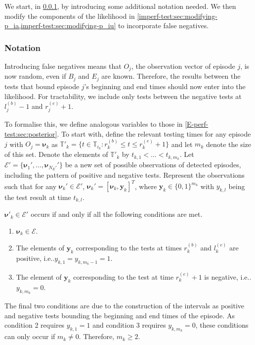 \documentclass[12pt]{article}
\makeatletter
\newcommand\set{\mathcal}
\renewcommand{\vec}[1]{\bm{#1}}
\newcommand{\ssep}{:}
\newcommand{\sched}{\mathbb{T}}
\DeclareRobustCommand\onedot{\futurelet\@let@token\@onedot}
\def\@onedot{\ifx\@let@token.\else.\null\fi\xspace}
\def\ie{i.e\onedot} \def\Ie{{I.e}\onedot}
\makeatother
\begin{document}
We start, in \cref{imperf-test:sec:notation}, by introducing some additional notation needed.
We then modify the components of the likelihood in \cref{imperf-test:sec:modifying-p_ia,imperf-test:sec:modifying-p_iu} to incorporate false negatives.


\subsubsection{Notation} \label{imperf-test:sec:notation}

Introducing false negatives means that $O_j$, the observation vector of episode $j$, is now random, even if $B_j$ and $E_j$ are known.
Therefore, the results between the tests that bound episode $j$'s beginning and end times should now enter into the likelihood.
For tractability, we include only tests between the negative tests at $l_j^{(b)}-1$ and $r_j^{(e)}+1$. 

To formalise this, we define analogous variables to those in \cref{E-perf-test:sec:posterior}.
To start with, define the relevant testing times for any episode $j$ with $O_j = \vec{\nu}_k$ as $\sched'_k = \{ t \in \sched_{i_k} \ssep r_k^{(b)} \leq t \leq r_k^{(e)} + 1 \}$ and let $m_k$ denote the size of this set.
Denote the elements of $\sched'_k$ by $t_{k,1} < \dots < t_{k,m_k}$.
Let $\set{E}' = \{ \vec{\nu}_1', \dots, \vec{\nu}_{N_E'}' \}$ be a new set of possible observations of detected episodes, including the pattern of positive and negative tests.
Represent the observations such that for any $\vec{\nu}_k' \in \set{E}'$, $\vec{\nu}_k' = [\vec{\nu}_{k}, \vec{y}_k]^T$, where $\vec{y}_k \in \{ 0, 1 \}^{m_k}$ with $y_{k,l}$ being the test result at time $t_{k,l}$.

$\vec{\nu}'_k \in \set{E}'$ occurs if and only if all the following conditions are met.
\begin{enumerate}
  \item $\vec{\nu}_k \in \set{E}$.
  \item The elements of $\vec{y}_k$ corresponding to the tests at times $r_k^{(b)}$ and $l_k^{(e)}$ are positive, \ie $y_{k,1} = y_{k,m_k-1} = 1$.
  \item The element of $\vec{y}_k$ corresponding to the test at time $r_k^{(e)} + 1$ is negative, \ie $y_{k,m_k} = 0$.
\end{enumerate}
The final two conditions are due to the construction of the intervals as positive and negative tests bounding the beginning and end times of the episode.
As condition 2 requires $y_{k,1} = 1$ and condition 3 requires $y_{k,m_k} = 0$, these conditions can only occur if $m_k \neq 0$.
Therefore, $m_k \geq 2$.
\end{document}
